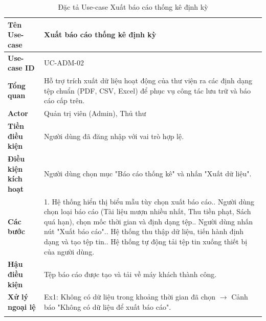 \newpage
\begin{longtable}{|p{3.5cm}|p{11.5cm}|}
    \hline
    \textbf{Tên Use-case} & \textbf{Xuất báo cáo thống kê định kỳ} \\
    \hline
    \textbf{Use-case ID} & UC-ADM-02 \\
    \hline
    \textbf{Tổng quan} & Hỗ trợ trích xuất dữ liệu hoạt động của thư viện ra các định dạng tệp chuẩn (PDF, CSV, Excel) để phục vụ công tác lưu trữ và báo cáo cấp trên. \\
    \hline
    \textbf{Actor} & Quản trị viên (Admin), Thủ thư \\
    \hline
    \textbf{Tiền điều kiện} & Người dùng đã đăng nhập với vai trò hợp lệ. \\
    \hline
    \textbf{Điều kiện kích hoạt} & Người dùng chọn mục "Báo cáo thống kê" và nhấn "Xuất dữ liệu". \\
    \hline
    \textbf{Các bước} & 
    1. Hệ thống hiển thị biểu mẫu tùy chọn xuất báo cáo.\newline
    2. Người dùng chọn loại báo cáo (Tài liệu mượn nhiều nhất, Thu tiền phạt, Sách quá hạn), chọn mốc thời gian và định dạng tệp.\newline
    3. Người dùng nhấn nút "Xuất báo cáo".\newline
    4. Hệ thống thu thập dữ liệu, tiến hành định dạng và tạo tệp tin.\newline
    5. Hệ thống tự động tải tệp tin xuống thiết bị của người dùng. \\
    \hline
    \textbf{Hậu điều kiện} & Tệp báo cáo được tạo và tải về máy khách thành công. \\
    \hline
    \textbf{Xử lý ngoại lệ} & 
    Ex1: Không có dữ liệu trong khoảng thời gian đã chọn $\rightarrow$ Cảnh báo "Không có dữ liệu để xuất báo cáo". \\
    \hline
    \caption{Đặc tả Use-case Xuất báo cáo thống kê định kỳ}
\end{longtable}



